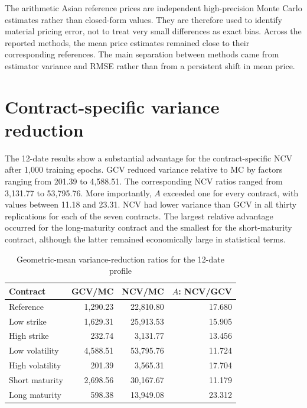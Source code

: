 The arithmetic Asian reference prices are independent high-precision Monte Carlo estimates rather than closed-form values. They are therefore used to identify material pricing error, not to treat very small differences as exact bias. Across the reported methods, the mean price estimates remained close to their corresponding references. The main separation between methods came from estimator variance and RMSE rather than from a persistent shift in mean price.

\section{Contract-specific variance reduction}

The 12-date results show a substantial advantage for the contract-specific NCV after 1{,}000 training epochs. GCV reduced variance relative to MC by factors ranging from 201.39 to 4{,}588.51. The corresponding NCV ratios ranged from 3{,}131.77 to 53{,}795.76. More importantly, $A$ exceeded one for every contract, with values between 11.18 and 23.31. NCV had lower variance than GCV in all thirty replications for each of the seven contracts. The largest relative advantage occurred for the long-maturity contract and the smallest for the short-maturity contract, although the latter remained economically large in statistical terms.

\begin{table}[htbp]
    \centering
    \caption{Geometric-mean variance-reduction ratios for the 12-date profile}
    \label{tab:vrf_12}
    \begin{tabular}{lrrr}
        \hline
        Contract & GCV/MC & NCV/MC & $A$: NCV/GCV \\
        \hline
        Reference & 1{,}290.23 & 22{,}810.80 & 17.680 \\
        Low strike & 1{,}629.31 & 25{,}913.53 & 15.905 \\
        High strike & 232.74 & 3{,}131.77 & 13.456 \\
        Low volatility & 4{,}588.51 & 53{,}795.76 & 11.724 \\
        High volatility & 201.39 & 3{,}565.31 & 17.704 \\
        Short maturity & 2{,}698.56 & 30{,}167.67 & 11.179 \\
        Long maturity & 598.38 & 13{,}949.08 & 23.312 \\
        \hline
    \end{tabular}
\end{table}

